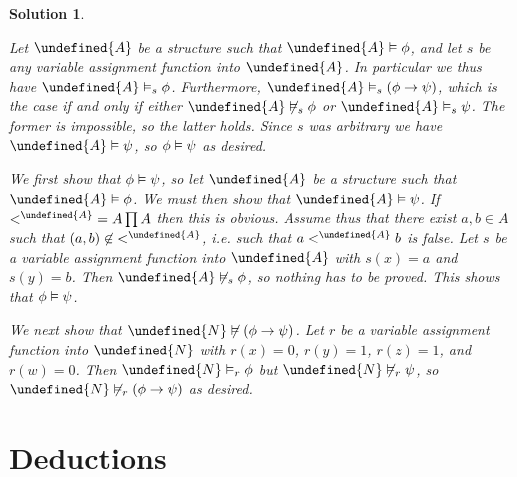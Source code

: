 \documentclass[article, a4paper, 11pt, oneside]{memoir}
\let\mathfrak\undefined
\numberwithin{equation}{chapter}
\newcommand{\frakN}{\mathfrak{N}}
\newcommand{\frakA}{\mathfrak{A}}
\theoremstyle{nonumberplain}
\newtheorem{solution}{Solution}
\begin{document}
\begin{solution}
\begin{solutionsec} %
    \item Let $\frakA$ be a structure such that $\frakA \models \phi$, and let $s$ be any variable assignment function into $\frakA$. In particular we thus have $\frakA \sats{s} \phi$. Furthermore, $\frakA \sats{s} (\phi \to \psi)$, which is the case if and only if either $\frakA \notsats{s} \phi$ or $\frakA \sats{s} \psi$. The former is impossible, so the latter holds. Since $s$ was arbitrary we have $\frakA \models \psi$, so $\phi \vDash \psi$ as desired.
    
    \item We first show that $\phi \vDash \psi$, so let $\frakA$ be a structure such that $\frakA \models \phi$. We must then show that $\frakA \models \psi$. If ${<^\frakA} = A \prod A$ then this is obvious. Assume thus that there exist $a,b \in A$ such that $(a,b) \not\in {<^\frakA}$, i.e. such that $a <^\frakA b$ is false. Let $s$ be a variable assignment function into $\frakA$ with $s(x) = a$ and $s(y) = b$. Then $\frakA \notsats{s} \phi$, so nothing has to be proved. This shows that $\phi \vDash \psi$.
    
    We next show that $\frakN \not\models (\phi \lcond \psi)$. Let $r$ be a variable assignment function into $\frakN$ with $r(x) = 0$, $r(y) = 1$, $r(z) = 1$, and $r(w) = 0$. Then $\frakN \sats{r} \phi$ but $\frakN \notsats{r} \psi$, so $\frakN \notsats{r} (\phi \lcond \psi)$ as desired.
\end{solutionsec}
\end{solution}


\chapter{Deductions}

\newcommand{\proves}{\vdash}
\newcommand{\thm}[1]{\mathit{Thm}_{#1}}
\end{document}
